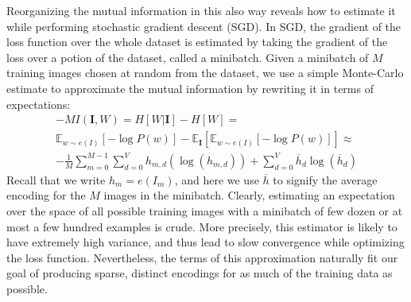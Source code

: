 Reorganizing the mutual information in this also way reveals how to estimate it while performing stochastic gradient descent (SGD). In SGD, the gradient of the loss function over the whole dataset is estimated by taking the gradient of the loss over a potion of the dataset, called a minibatch. Given a minibatch of $M$ training images chosen at random from the dataset, we use a simple Monte-Carlo estimate to approximate the mutual information by rewriting it in terms of expectations:
\begin{equation}
\begin{split}
    -MI\left(\mathbf{I}, W\right) = H[W | \mathbf{I}] - H[W] = \\
    \mathbb{E}_{w \sim e(I)}\left[ -\log P(w) \right] - \mathbb{E}_\mathbf{I}\left[ \mathbb{E}_{w \sim e(I)}\left[ -\log P(w) \right] \right] \approx \\
    -\frac{1}{M} \sum_{m=0}^{M-1} \sum_{d=0}^V h_{m,d} (\log(h_{m,d})) +
            \sum_{d=0}^V \overline{h}_d \log(\overline{h}_d)
    \end{split}
\end{equation}
Recall that we write $h_m = e(I_m)$, and here we use $\overline{h}$ to signify the average encoding for the $M$ images in the minibatch.
Clearly, estimating an expectation over the space of all possible training images with a minibatch of few dozen or at most a few hundred examples is crude. More precisely, this estimator is likely to have extremely high variance, and thus lead to slow convergence while optimizing the loss function. Nevertheless, the terms of this approximation naturally fit our goal of producing sparse, distinct encodings for as much of the training data as possible.

